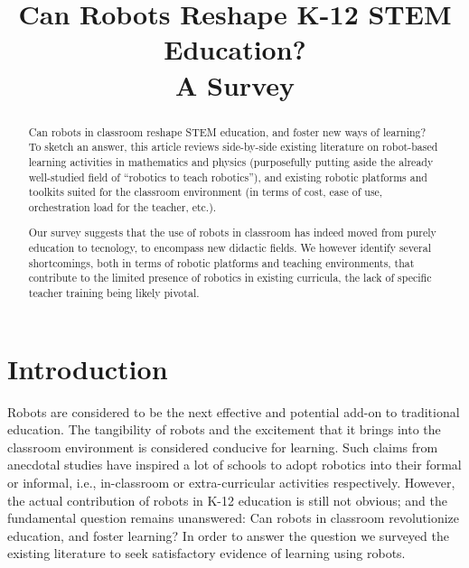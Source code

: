 \documentclass[conference]{IEEEtran}
\begin{document}
\title{Can Robots Reshape K-12 STEM Education? \\A Survey}
\author{
}
  
\maketitle

\begin{abstract}

Can robots in classroom reshape STEM education, and foster new ways of learning?
To sketch an answer, this article reviews side-by-side existing literature on
robot-based learning activities in mathematics and physics (purposefully putting
aside the already well-studied field of ``robotics to teach robotics''), and
existing robotic platforms and toolkits suited for the classroom environment (in
terms of cost, ease of use, orchestration load for the teacher, etc.).

Our survey suggests that the use of robots in classroom has indeed moved from
purely education to tecnology, to encompass new didactic fields. We however
identify several shortcomings, both in terms of robotic platforms and teaching
environments, that contribute to the limited presence of robotics in existing
curricula, the lack of specific teacher training being likely pivotal.

\end{abstract}

\IEEEpeerreviewmaketitle

\section{Introduction}

Robots are considered to be the next effective and potential add-on to traditional education. The tangibility of robots 
and the excitement that it brings into the classroom environment is considered conducive for learning. Such claims from 
anecdotal studies have inspired a lot of schools to adopt robotics into their formal or informal, i.e., in-classroom or 
extra-curricular activities respectively. However, the actual contribution of robots in K-12 education is still not 
obvious; and the fundamental question remains unanswered: Can robots in classroom revolutionize education, and foster 
learning? In order to answer the question we surveyed the existing literature to seek satisfactory evidence of learning 
using robots. 
\end{document}
